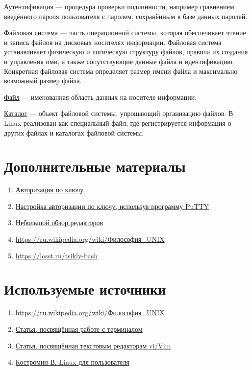 \documentclass[14pt, a4paper]{article}
\begin{document}
\href{https://ru.wikipedia.org/wiki/Аутентификация}{Аутентификация} — процедура проверки подлинности, например сравнением введённого пароля
пользователя с паролем, сохранённым в базе данных паролей.

\href{https://opencentr.ru/article/fajlovaya-sistema-linux/}{Файловая система} — часть операционной системы, которая обеспечивает чтение и запись файлов
на дисковых носителях информации. Файловая система устанавливает физическую и логическую
структуру файлов, правила их создания и управления ими, а также сопутствующие данные файла и
идентификацию. Конкретная файловая система определяет размер имени файла и максимально
возможный размер файла.

\href{https://ru.wikipedia.org/wiki/Файл}{Файл} — именованная область данных на носителе информации.

\href{https://ru.wikipedia.org/wiki/Каталог_(файловая_система)}{Каталог} — объект файловой системы, упрощающий организацию файлов. В Linux реализован как
специальный файл, где регистрируется информация о других файлах и каталогах файловой системы.


\section*{Дополнительные материалы}

\begin{enumerate}
    \item \href{https://losst.ru/avtorizatsiya-po-klyuchu-ssh}{Авторизация по ключу}
    \item \href{https://rtfm.co.ua/putty-nastrojka-avtorizacii-ssh-po-klyuchu/}{Настройка авторизации по ключу, используя программу PuTTY}
    \item \href{https://losst.ru/luchshie-tekstovye-redaktory-linux}{Небольшой обзор редакторов}
    \item \href{https://ru.wikipedia.org/wiki/Философия_UNIX}{https://ru.wikipedia.org/wiki/Философия\_UNIX}
    \item \url{https://losst.ru/tsikly-bash}
\end{enumerate}


\section*{Используемые источники}
\begin{enumerate}
    \item \href{https://ru.wikipedia.org/wiki/Философия_UNIX}{https://ru.wikipedia.org/wiki/Философия\_UNIX}
    \item \href{https://help.ubuntu.ru/manual/терминал}{Статья, посвящённая работе с терминалом}
    \item \href{https://help.ubuntu.ru/wiki/vim}{Статья, посвящённая текстовым редакторам vi/Vim}
    \item \href{http://www.linuxcenter.ru/lib/books/kostromin/}{Костромин В. Linux для пользователя}
\end{enumerate}
\end{document}
